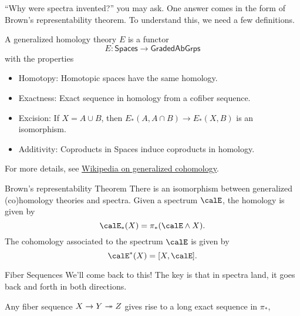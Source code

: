 ``Why were spectra invented?'' you may ask. One answer comes in the form of Brown's representability theorem. To understand this, we need a few definitions. 
\begin{definition}{}{}
    A generalized homology theory $E$ is a functor $$E:\mathsf{Spaces}\to \mathsf{GradedAbGrps}$$ with the properties 
    \begin{itemize}
        \item Homotopy: Homotopic spaces have the same homology.
        \item Exactness: Exact sequence in homology from a cofiber sequence. 
        \item Excision: If $X = A\cup B$, then $E_\ast(A,A\cap B)\to E_\ast(X,B)$ is an isomorphism. 
        \item Additivity: Coproducts in Spaces induce coproducts in homology.
    \end{itemize}
    For more details, see \href{https://en.wikipedia.org/wiki/Cohomology#Axioms_and_generalized_cohomology_theories}{Wikipedia on generalized cohomology}.
\end{definition}

\begin{theorem}{Brown's representability Theorem}{}
    There is an isomorphism between generalized (co)homology theories and spectra. Given a spectrum $\calE$, the homology is given by $$\calE_\ast(X) = \pi_\ast(\calE\wedge X).$$ The cohomology associated to the spectrum $\calE$ is given by $$\calE^\ast(X) = [X,\calE].$$
\end{theorem}

\begin{definition}{Fiber Sequences}{}
    We'll come back to this! The key is that in spectra land, it goes back and forth in both directions. 
\end{definition}

\begin{fact}{}{}
    Any fiber sequence $X\to Y\twoheadrightarrow Z$ gives rise to a long exact sequence in $\pi_\ast$, %
    \begin{center}
    \end{center}
\end{fact}

